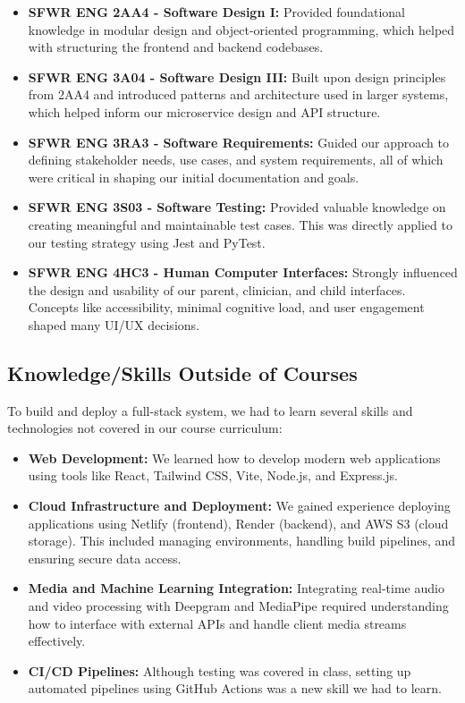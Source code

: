 \documentclass{article}
\begin{document}
\begin{itemize}
    \item \textbf{SFWR ENG 2AA4 - Software Design I:} Provided foundational knowledge in modular design and object-oriented programming, which helped with structuring the frontend and backend codebases.
    
    \item \textbf{SFWR ENG 3A04 - Software Design III:} Built upon design principles from 2AA4 and introduced patterns and architecture used in larger systems, which helped inform our microservice design and API structure.
    
    \item \textbf{SFWR ENG 3RA3 - Software Requirements:} Guided our approach to defining stakeholder needs, use cases, and system requirements, all of which were critical in shaping our initial documentation and goals.
    
    \item \textbf{SFWR ENG 3S03 - Software Testing:} Provided valuable knowledge on creating meaningful and maintainable test cases. This was directly applied to our testing strategy using Jest and PyTest.
    
    \item \textbf{SFWR ENG 4HC3 - Human Computer Interfaces:} Strongly influenced the design and usability of our parent, clinician, and child interfaces. Concepts like accessibility, minimal cognitive load, and user engagement shaped many UI/UX decisions.
\end{itemize}


\subsection{Knowledge/Skills Outside of Courses}

To build and deploy a full-stack system, we had to learn several skills and technologies not covered in our course curriculum:

\begin{itemize}
    \item \textbf{Web Development:} We learned how to develop modern web applications using tools like React, Tailwind CSS, Vite, Node.js, and Express.js.
    
    \item \textbf{Cloud Infrastructure and Deployment:} We gained experience deploying applications using Netlify (frontend), Render (backend), and AWS S3 (cloud storage). 
    This included managing environments, handling build pipelines, and ensuring secure data access.
    
    \item \textbf{Media and Machine Learning Integration:} Integrating real-time audio and video processing with Deepgram and MediaPipe required understanding how to interface with external APIs and handle client media streams effectively.
    
    \item \textbf{CI/CD Pipelines:} Although testing was covered in class, setting up automated pipelines using GitHub Actions was a new skill we had to learn.
\end{itemize}
\end{document}
